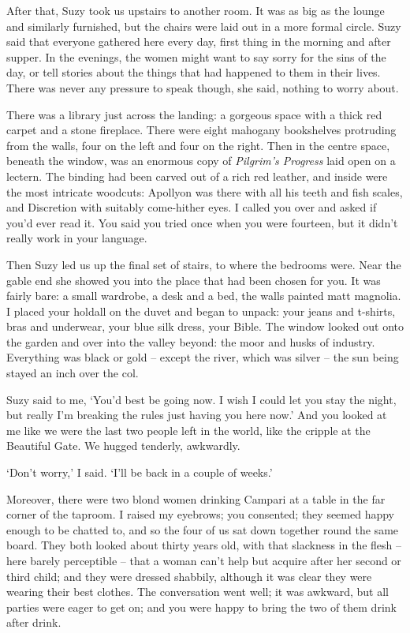 After that, Suzy took us upstairs to another room. It was as big as the lounge and similarly furnished, but the chairs were laid out in a more formal circle. Suzy said that everyone gathered here every day, first thing in the morning and after supper. In the evenings, the women might want to say sorry for the sins of the day, or tell stories about the things that had happened to them in their lives. There was never any pressure to speak though, she said, nothing to worry about.

There was a library just across the landing: a gorgeous space with a thick red carpet and a stone fireplace. There were eight mahogany bookshelves protruding from the walls, four on the left and four on the right. Then in the centre space, beneath the window, was an enormous copy of \emph{Pilgrim's Progress} laid open on a lectern. The binding had been carved out of a rich red leather, and inside were the most intricate woodcuts: Apollyon was there with all his teeth and fish scales, and Discretion with suitably come-hither eyes. I called you over and asked if you'd ever read it. You said you tried once when you were fourteen, but it didn't really work in your language.

Then Suzy led us up the final set of stairs, to where the bedrooms were. Near the gable end she showed you into the place that had been chosen for you. It was fairly bare: a small wardrobe, a desk and a bed, the walls painted matt magnolia. I placed your holdall on the duvet and began to unpack: your jeans and t-shirts, bras and underwear, your blue silk dress, your Bible. The window looked out onto the garden and over into the valley beyond: the moor and husks of industry. Everything was black or gold -- except the river, which was silver -- the sun being stayed an inch over the col.

Suzy said to me, `You'd best be going now. I wish I could let you stay the night, but really I'm breaking the rules just having you here now.' And you looked at me like we were the last two people left in the world, like the cripple at the Beautiful Gate. We hugged tenderly, awkwardly.

`Don't worry,' I said. `I'll be back in a couple of weeks.'

\prosesep

Moreover, there were two blond women drinking Campari at a table in the far corner of the taproom. I raised my eyebrows; you consented; they seemed happy enough to be chatted to, and so the four of us sat down together round the same board. They both looked about thirty years old, with that slackness in the flesh -- here barely perceptible -- that a woman can't help but acquire after her second or third child; and they were dressed shabbily, although it was clear they were wearing their best clothes. The conversation went well; it was awkward, but all parties were eager to get on; and you were happy to bring the two of them drink after drink.

